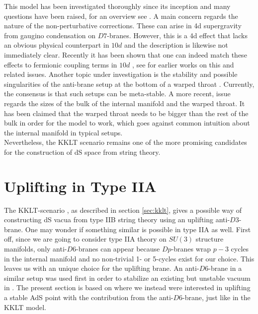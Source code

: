 \documentclass[a4paper,12pt,twoside,openright]{report}
\begin{document}
This model has been investigated thoroughly since its inception and many questions have been raised, for an overview see \cite{Andriot:2019wrs}. A main concern regards the nature of the non-perturbative corrections. These can arise in 4d supergravity from gaugino condensation on $D7$-branes. However, this is a 4d effect that lacks an obvious physical counterpart in $10d$ and the description is likewise not immediately clear. Recently it has been shown that one can indeed match these effects to fermionic coupling terms in $10d$ \cite{Kachru:2019dvo}, see \cite{Moritz:2017xto,Hamada:2018qef,Gautason:2018gln,Carta:2019rhx,Gautason:2019jwq,Hamada:2019ack,Bena:2019mte,Koerber:2007xk,Baumann:2010sx,Dymarsky:2010mf} for earlier works on this and related issues. Another topic under investigation is the stability and possible singularities of the anti-brane setup at the bottom of a warped throat \cite{Armas:2018rsy,Blaback:2012nf,Bena:2009xk,Bena:2012tx,McGuirk:2009xx,Dymarsky:2011pm,Polchinski:2000uf,Blaback:2019ucp,Danielsson:2016cit,Bena:2013hr,Blaback:2014tfa,Polchinski:2015bea,Cohen-Maldonado:2015ssa,Gautason:2015tla,Kuperstein:2014zda,Danielsson:2014yga}. Currently, the consensus is that such setups can be meta-stable. A more recent, issue regards the sizes of the bulk of the internal manifold and the warped throat. It has been claimed \cite{Gao:2020xqh} that the warped throat needs to be bigger than the rest of the bulk in order for the model to work, which goes against common intuition about the internal manifold in typical setups.\\
Nevertheless, the KKLT scenario remains one of the more promising candidates for the construction of dS space from string theory.

\section{Uplifting in Type  IIA}
\label{sec:IIAuplift}
The KKLT-scenario \cite{Kachru:2003aw,Kachru:2003sx}, as described in section \ref{sec:kklt}, gives a possible way of constructing dS vacua from type IIB string theory using an uplifting anti-$D3$-brane. One may wonder if something similar is possible in type IIA as well. First off, since we are going to consider type IIA theory on $SU(3)$ structure manifolds, only anti-$D6$-branes can appear because $Dp$-branes wrap $p-3$ cycles in the internal manifold and no non-trivial 1- or 5-cycles exist for our choice. This leaves us with an unique choice for the uplifting brane. An anti-$D6$-brane in a similar setup was used first in order to stabilize an existing but unstable vacuum in \cite{Kallosh:2018nrk}. The present section is based on \cite{Cribiori:2019bfx} where we instead were interested in uplifting a stable AdS point with the contribution from the anti-$D6$-brane, just like in the KKLT model.
\end{document}
